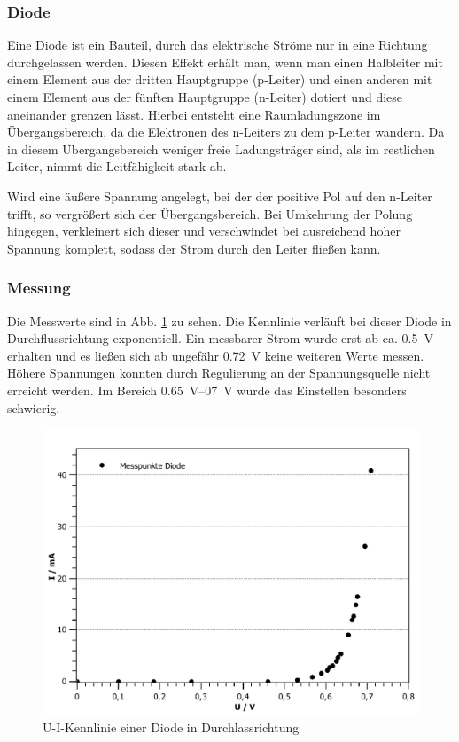 \documentclass[11pt,a4paper,titlepage, ngerman]{article}
\begin{document}
			\subsubsection*{Diode}
				\label{Diode}
								
				Eine Diode ist ein Bauteil, durch das elektrische Ströme nur in eine Richtung durchgelassen werden.
				Diesen Effekt erhält man, wenn man einen Halbleiter mit einem Element aus der dritten Hauptgruppe (p-Leiter) und einen anderen mit einem Element aus der fünften Hauptgruppe (n-Leiter) dotiert und diese aneinander grenzen lässt.
				Hierbei entsteht eine Raumladungszone im Übergangsbereich, da die Elektronen des n-Leiters zu dem p-Leiter wandern.
				Da in diesem Übergangsbereich weniger freie Ladungsträger sind, als im restlichen Leiter, nimmt die Leitfähigkeit stark ab.
				
				Wird eine äußere Spannung angelegt, bei der der positive Pol auf den n-Leiter trifft, so vergrößert sich der Übergangsbereich.
				Bei Umkehrung der Polung hingegen, verkleinert sich dieser und verschwindet bei ausreichend hoher Spannung komplett, sodass der Strom durch den Leiter fließen kann. 
			
			\subsubsection*{Messung}
				
				Die Messwerte sind in Abb. \ref{KL a} zu sehen. Die Kennlinie verläuft bei dieser Diode in Durchflussrichtung exponentiell.
				Ein messbarer Strom wurde erst ab ca. \SI{0.5}{\volt} erhalten und es ließen sich ab ungefähr \SI{0.72}{\volt} keine weiteren Werte messen. Höhere Spannungen konnten durch Regulierung an der Spannungsquelle nicht erreicht werden. Im Bereich \SIrange{0,65}{07}{\volt} wurde das Einstellen besonders schwierig.
				
				\begin{figure}[ht]
					\centering
					\includegraphics[width=\textwidth]{KennlinieDiode_2.pdf}
					\caption{U-I-Kennlinie einer Diode in Durchlassrichtung}
					\label{KL a}
				\end{figure}
			
\end{document}
